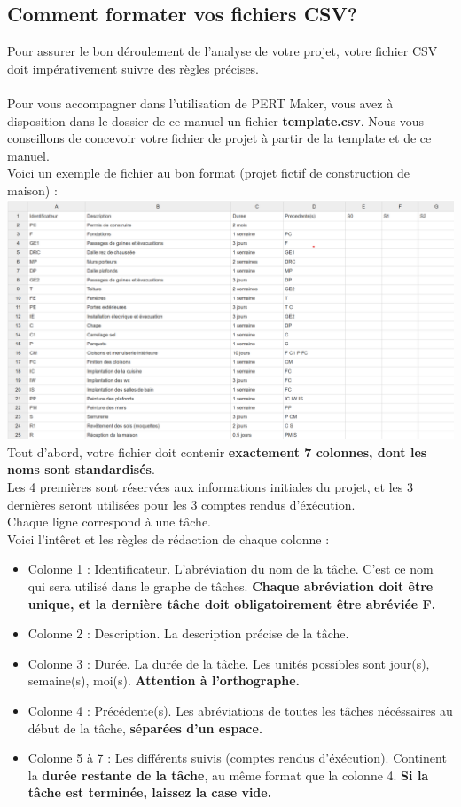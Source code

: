 \documentclass{article}
\begin{document}
\subsection{Comment formater vos fichiers CSV?}
Pour assurer le bon déroulement de l'analyse de votre projet, votre fichier CSV doit impérativement suivre des règles précises.\\ \\
Pour vous accompagner dans l'utilisation de PERT Maker, vous avez à disposition dans le dossier de ce manuel un fichier \textbf{template.csv}. Nous vous conseillons de concevoir votre fichier de projet
à partir de la template et de ce manuel. 
\\ 
Voici un exemple de fichier au bon format (projet fictif de construction de maison) :
\\
\includegraphics[scale=0.5]{csv_exemple}
\\
Tout d'abord, votre fichier doit contenir \textbf{exactement 7 colonnes, dont les noms sont standardisés}.\\
Les 4 premières sont réservées aux informations initiales du projet,
et les 3 dernières seront utilisées pour les 3 comptes rendus d'éxécution. \\
Chaque ligne correspond à une tâche. \\
Voici l'intêret et les règles de rédaction de chaque colonne : \\
\begin{itemize}
    \item Colonne 1 : Identificateur. L'abréviation du nom de la tâche. C'est ce nom qui sera utilisé dans le graphe de tâches. \textbf{Chaque abréviation doit être unique, et la dernière tâche doit obligatoirement être abréviée F.}
    \item Colonne 2 : Description.  La description précise de la tâche.
    \item Colonne 3 : Durée. La durée de la tâche. Les unités possibles sont jour(s), semaine(s), moi(s). \textbf{Attention à l'orthographe.}
    \item Colonne 4 : Précédente(s). Les abréviations de toutes les tâches nécéssaires au début de la tâche, \textbf{séparées d'un espace.}
    \item Colonne 5 à 7 : Les différents suivis (comptes rendus d'éxécution). Continent la \textbf{durée restante de la tâche}, au même format que la colonne 4. \textbf{Si la tâche est terminée, laissez la case vide.}
\end{itemize}
\end{document}
